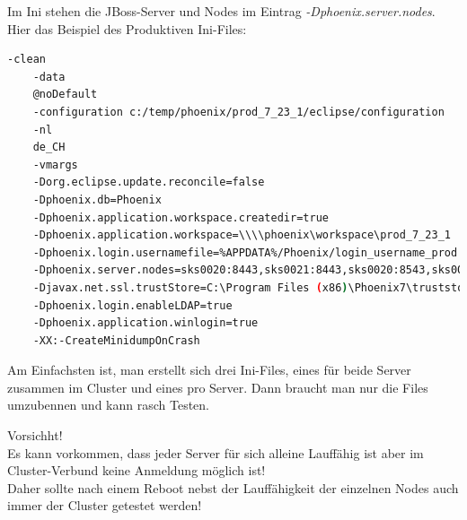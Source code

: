 \begin{flushleft}
\end{flushleft}
\begin{flushleft}
    Im Ini stehen die \Gls{JBoss}-Server und Nodes im Eintrag \textit{-Dphoenix.server.nodes}.
    Hier das Beispiel des Produktiven Ini-Files:
    \lstset{style=gra_codestyle}
    \begin{lstlisting}[language=sh, caption=Workstation.ini PROD Beispiel,captionpos=b,label={lst:workstation.ini-prod-beispiel},breaklines=true]
    -clean
    -data
    @noDefault
    -configuration c:/temp/phoenix/prod_7_23_1/eclipse/configuration
    -nl
    de_CH
    -vmargs
    -Dorg.eclipse.update.reconcile=false
    -Dphoenix.db=Phoenix
    -Dphoenix.application.workspace.createdir=true
    -Dphoenix.application.workspace=\\\\phoenix\workspace\prod_7_23_1
    -Dphoenix.login.usernamefile=%APPDATA%/Phoenix/login_username_prod
    -Dphoenix.server.nodes=sks0020:8443,sks0021:8443,sks0020:8543,sks0021:8543
    -Djavax.net.ssl.trustStore=C:\Program Files (x86)\Phoenix7\truststore.jks
    -Dphoenix.login.enableLDAP=true
    -Dphoenix.application.winlogin=true
    -XX:-CreateMinidumpOnCrash
    \end{lstlisting}
\end{flushleft}
\begin{flushleft}
    Am Einfachsten ist, man erstellt sich drei Ini-Files, eines für beide Server zusammen im Cluster und eines pro Server.
    Dann braucht man nur die Files umzubennen und kann rasch Testen.
\end{flushleft}
\begin{flushleft}
    \begin{mdframed}
    Vorsichht!\\Es kann vorkommen, dass jeder Server für sich alleine Lauffähig ist aber im Cluster-Verbund keine Anmeldung möglich ist!\\
    Daher sollte nach einem Reboot nebst der Lauffähigkeit der einzelnen Nodes auch immer der Cluster getestet werden!
    \end{mdframed}
\end{flushleft}
